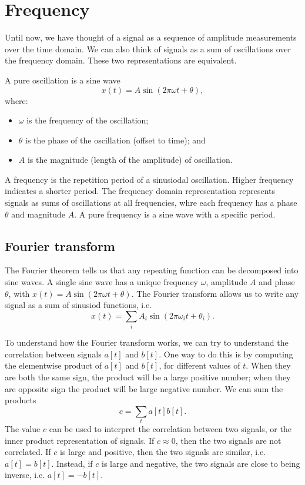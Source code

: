 \documentclass[a4paper, openany]{memoir}
\begin{document}
\section{Frequency}
Until now, we have thought of a signal as a sequence of amplitude measurements over the time domain. We can also think of signals as a sum of oscillations over the frequency domain. These two representations are equivalent.

A pure oscillation is a sine wave
\[x(t) = A \sin (2 \pi \omega t + \theta),\]
where:
\begin{itemize}
    \item $\omega$ is the frequency of the oscillation;
    \item $\theta$ is the phase of the oscillation (offset to time); and
    \item $A$ is the magnitude (length of the amplitude) of oscillation.
\end{itemize}

A frequency is the repetition period of a sinusiodal oscillation. Higher frequency indicates a shorter period. The frequency domain representation represents signals as sums of oscillations at all frequencies, whre each frequency has a phase $\theta$ and magnitude $A$. A pure frequency is a sine wave with a specific period.

\subsection{Fourier transform}
The Fourier theorem tells us that any repeating function can be decomposed into sine waves. A single sine wave has a unique frequency $\omega$, amplitude $A$ and phase $\theta$, with $x(t) = A \sin (2\pi \omega t + \theta)$. The Fourier transform allows us to write any signal as a sum of sinusiod functions, i.e.
\[x(t) = \sum_i A_i \sin(2\pi \omega_i t + \theta_i).\]

To understand how the Fourier transform works, we can try to understand the correlation between signals $a[t]$ and $b[t]$. One way to do this is by computing the elementwise product of $a[t]$ and $b[t]$, for different values of $t$. When they are both the same sign, the product will be a large positive number; when they are opposite sign the product will be large negative number. We can sum the products
\[c = \sum_t a[t] b[t].\]
The value $c$ can be used to interpret the correlation between two signals, or the inner product representation of signals. If $c \approx 0$, then the two signals are not correlated. If $c$ is large and positive, then the two signals are similar, i.e. $a[t] = b[t]$. Instead, if $c$ is large and negative, the two signals are close to being inverse, i.e. $a[t] = -b[t]$.
\end{document}
